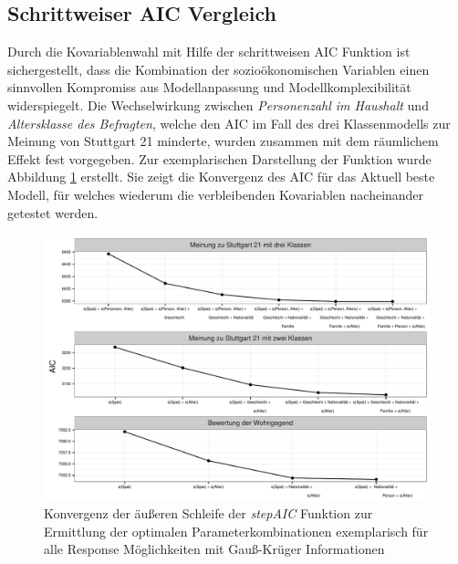 \documentclass{Vorlage}
\begin{document}
\subsection{Schrittweiser AIC Vergleich}
Durch die Kovariablenwahl mit Hilfe der schrittweisen AIC Funktion ist sichergestellt, dass die Kombination der sozioökonomischen Variablen einen sinnvollen Kompromiss aus Modellanpassung und Modellkomplexibilität widerspiegelt. Die Wechselwirkung zwischen \textit{Personenzahl im Haushalt} und \textit{Altersklasse des Befragten}, welche den AIC im Fall des drei Klassenmodells zur Meinung von Stuttgart 21 minderte, wurden zusammen mit dem räumlichem Effekt fest vorgegeben. Zur exemplarischen Darstellung der Funktion wurde Abbildung \ref{AIC} erstellt. Sie zeigt die Konvergenz des AIC für das Aktuell beste Modell, für welches wiederum die verbleibenden Kovariablen nacheinander getestet werden. 

\begin{figure}[h]
 \begin{center}
 \includegraphics[scale=0.8]{Pictures/stepAIC}
 \caption{Konvergenz der äußeren Schleife der \textit{stepAIC} Funktion zur Ermittlung der optimalen Parameterkombinationen exemplarisch für alle Response Möglichkeiten mit Gauß-Krüger Informationen}
 \label{AIC}
 \end{center}
\end{figure}
\end{document}
